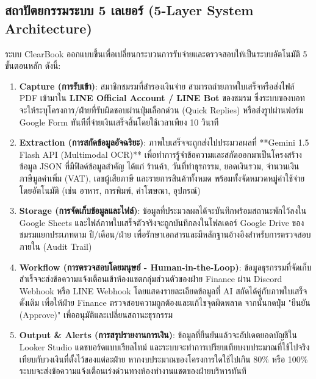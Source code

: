 \documentclass[10pt,a4paper]{article}
\begin{document}
\subsection{สถาปัตยกรรมระบบ 5 เลเยอร์ (5-Layer System Architecture)}
ระบบ ClearBook ออกแบบขึ้นเพื่อเปลี่ยนกระบวนการรับจ่ายและตรวจสอบให้เป็นระบบอัตโนมัติ 5 ขั้นตอนหลัก ดังนี้:
\begin{enumerate}[label=\bfseries เลเยอร์ \arabic*:]
  \item \textbf{Capture (การรับเข้า)}: 
  สมาชิกชมรมที่สำรองเงินจ่าย สามารถถ่ายภาพใบเสร็จหรือส่งไฟล์ PDF เข้ามาใน \textbf{LINE Official Account / LINE Bot} ของชมรม ซึ่งระบบของบอทจะให้ระบุโครงการ/ฝ่ายที่รับผิดชอบผ่านปุ่มเลือกด่วน (Quick Replies) หรือส่งรูปผ่านฟอร์ม Google Form ทันทีที่จ่ายเงินเสร็จสิ้นโดยใช้เวลาเพียง 10 วินาที
  
  \item \textbf{Extraction (การสกัดข้อมูลอัจฉริยะ)}: 
  ภาพใบเสร็จจะถูกส่งไปประมวลผลที่ **Gemini 1.5 Flash API (Multimodal OCR)** เพื่อทำการรู้จำข้อความและสกัดออกมาเป็นโครงสร้างข้อมูล JSON ที่มีฟิลด์ข้อมูลสำคัญ ได้แก่ ร้านค้า, วันที่ทำธุรกรรม, ยอดเงินรวม, จำนวนเงินภาษีมูลค่าเพิ่ม (VAT), เลขผู้เสียภาษี และรายการสินค้าทั้งหมด พร้อมทั้งจัดหมวดหมู่ค่าใช้จ่ายโดยอัตโนมัติ (เช่น อาหาร, การพิมพ์, ค่าโฆษณา, อุปกรณ์)
  
  \item \textbf{Storage (การจัดเก็บข้อมูลและไฟล์)}: 
  ข้อมูลที่ประมวลผลได้จะบันทึกพร้อมสถานะพักไว้ลงใน Google Sheets และไฟล์ภาพใบเสร็จตัวจริงจะถูกบันทึกลงในโฟลเดอร์ Google Drive ของชมรมแยกประเภทตาม ปี/เดือน/ฝ่าย เพื่อรักษาเอกสารและมีหลักฐานอ้างอิงสำหรับการตรวจสอบภายใน (Audit Trail)
  
  \item \textbf{Workflow (การตรวจสอบโดยมนุษย์ - Human-in-the-Loop)}: 
  ข้อมูลธุรกรรมที่จัดเก็บสำเร็จจะส่งข้อความแจ้งเตือนเข้าห้องแชตกลุ่มส่วนตัวของฝ่าย Finance ผ่าน Discord Webhook หรือ LINE Webhook โดยแสดงรายละเอียดข้อมูลที่ AI สกัดได้คู่กับภาพใบเสร็จดั้งเดิม เพื่อให้ฝ่าย Finance ตรวจสอบความถูกต้องและแก้ไขจุดผิดพลาด จากนั้นกดปุ่ม "ยืนยัน (Approve)" เพื่ออนุมัติและเปลี่ยนสถานะธุรกรรม
  
  \item \textbf{Output \& Alerts (การสรุปรายงานการเงิน)}: 
  ข้อมูลที่ยืนยันแล้วจะอัปเดตยอดบัญชีใน Looker Studio แดชบอร์ดแบบเรียลไทม์ และระบบจะทำการเปรียบเทียบงบประมาณที่ใช้ไปจริงเทียบกับวงเงินที่ตั้งไว้ของแต่ละฝ่าย หากงบประมาณของโครงการใดใช้ไปเกิน 80\% หรือ 100\% ระบบจะส่งข้อความแจ้งเตือนเร่งด่วนทางห้องทำงานแชตของฝ่ายบริหารทันที
\end{enumerate}
\end{document}
